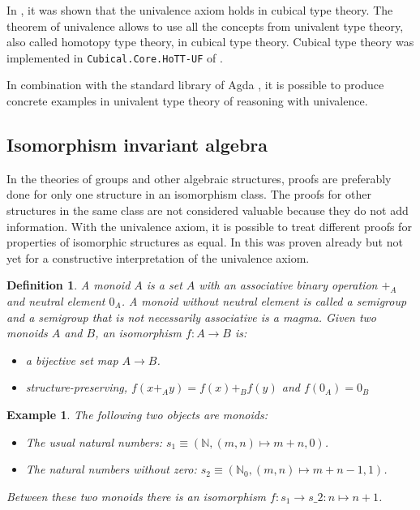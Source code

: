 \documentclass[12pt,a4paper,twoside,xetex]{book} %
\newcommand{\keyword}[1]{\emph{#1}\index{#1}}
\newtheorem{definition}[theorem]{Definition}
\newtheorem{example}[theorem]{Example}
\begin{document}
In , it was shown that the univalence axiom holds in 
cubical type theory. The theorem of univalence allows to use all the 
concepts from univalent type theory, also called homotopy type theory, in 
cubical type theory. Cubical type theory was implemented in 
\texttt{Cubical.Core.HoTT-UF} of \cite{Moertberg2018}.

In combination with the standard library of Agda \cite{Danielsson2019}, it is 
possible to produce concrete examples in univalent type theory of reasoning 
with univalence.

\subsection{Isomorphism invariant algebra}\label{magmas}

In the theories of groups and other algebraic structures, proofs are preferably 
done for only one structure in an isomorphism class. The proofs for other 
structures in the same class are not considered valuable because they do not 
add information. With the univalence axiom, it is possible to treat 
different proofs for properties of isomorphic structures as equal. In \cite{Danielsson2012} this was proven already but not yet for a constructive interpretation of the univalence axiom.

\begin{definition}
A \keyword{monoid} $A$ is a set $A$ with an associative binary operation $+_A$ and neutral element $0_A$. A monoid without neutral element is called a \keyword{semigroup} and a semigroup that is not necessarily associative is a \keyword{magma}. Given two monoids $A$ and $B$, an isomorphism $f : A \rightarrow B$ is:
\begin{itemize}
 \item a bijective set map $A \rightarrow B$.
 \item structure-preserving, $f(x +_A y) = f(x) +_B f(y)$ and $f(0_A) = 0_B$
\end{itemize}
\end{definition}
 
 
 
\begin{example}
The following two objects are monoids:
\begin{itemize}
 \item The usual natural numbers: $s_1  \equiv (\mathbb{N}, (m,n)\mapsto m+n, 0)$.
 \item The natural numbers without zero: $s_2 \equiv (\mathbb{N}_0, 
(m,n)\mapsto m+n -1, 1)$.
\end{itemize}
 Between these two monoids there is an isomorphism $f : s_1 \rightarrow s\_2 : n \mapsto n +1$. 
\end{example}
\end{document}
